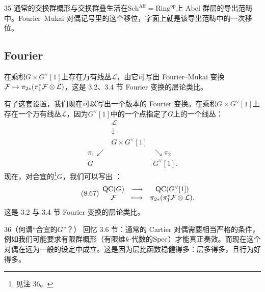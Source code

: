 \begin{srcrem}{35}
通常的交换群概形与交换群叠生活在$\mathrm{Sch}^{\mathrm{Aff}}=\mathrm{Ring}^{\mathrm{op}}$上 Abel 群层的导出范畴中。Fourier--Mukai 对偶记号里的这个移位，字面上就是该导出范畴中的一次移位。
\end{srcrem}

\subsection{Fourier}
\begin{sectionkey}
在乘积$G\times G^{\vee}[1]$上存在万有线丛$\mathcal L$，由它可写出 Fourier--Mukai 变换$\mathcal{F}\mapsto\pi_{2*}(\pi_1^{*}\mathcal{F}\otimes\mathcal L)$，这是 3.2、3.4 节 Fourier 变换的层论类比。
\end{sectionkey}

有了这套设置，我们现在可以写出一个版本的 Fourier 变换。在乘积$G\times G^{\vee}[1]$上存在一个万有线丛$\mathcal L$，因为$G^{\vee}[1]$中的一个点指定了$G$上的一个线丛：
\begin{equation}\tag{8.66}
\begin{array}{ccc}
 & \mathcal L &\\[-4pt]
 & \downarrow &\\[-6pt]
 & G\times G^{\vee}[1] &\\[-2pt]
 \pi_1\swarrow & & \searrow\pi_2\\[-2pt]
 G & & G^{\vee}[1].
\end{array}
\end{equation}
现在，对合宜的\footnote{见注 36。}$G$，我们可以写出 ：
\begin{equation}\tag{8.67}
\begin{array}{ccc}
\mathrm{QC}(G) & \longrightarrow & \mathrm{QC}(G^{\vee}[1])\\
\mathcal{F} & \longmapsto & \pi_{2*}(\pi_1^{*}\mathcal{F}\otimes\mathcal L).
\end{array}
\end{equation}
这是 3.2 与 3.4 节 Fourier 变换的层论类比。

\begin{srcrem}{36}（何谓“合宜的$G$”？）
回忆 3.6 节：通常的 Cartier 对偶需要相当严格的条件，例如我们可能要求有限群概形（有限维$k$-代数的$\mathrm{Spec}$）才能真正奏效。而现在这个对偶在远为一般的设定中成立。这是因为层比函数稳健得多：层多得多，且行为好得多。
\end{srcrem}

